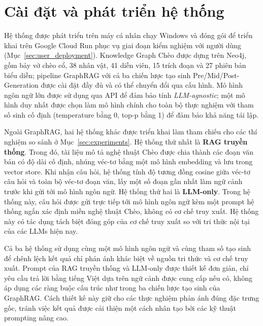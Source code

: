 
\section{Cài đặt và phát triển hệ thống}
\label{sec:system_setup}

Hệ thống được phát triển trên máy cá nhân chạy Windows và đóng gói để triển khai trên Google Cloud Run phục vụ giai đoạn kiểm nghiệm với người dùng (Mục~\ref{sec:user_deployment}). Knowledge Graph Chèo được dựng trên Neo4j, gồm bảy vở chèo cổ, 38 nhân vật, 41 diễn viên, 15 trích đoạn và 27 phiên bản biểu diễn; pipeline GraphRAG với cả ba chiến lược tạo sinh Pre/Mid/Post-Generation được cài đặt đầy đủ và có thể chuyển đổi qua cấu hình. Mô hình ngôn ngữ lớn được sử dụng qua API để đảm bảo tính \textit{LLM-agnostic}; một mô hình duy nhất được chọn làm mô hình chính cho toàn bộ thực nghiệm với tham số sinh cố định (temperature bằng 0, top-p bằng 1) để đảm bảo khả năng tái lập.

Ngoài GraphRAG, hai hệ thống khác được triển khai làm tham chiếu cho các thí nghiệm so sánh ở Mục~\ref{sec:experiments}. Hệ thống thứ nhất là \textbf{RAG truyền thống}. Trong đó, tài liệu mô tả nghệ thuật Chèo được chia thành các đoạn văn bản có độ dài cố định, nhúng véc-tơ bằng một mô hình embedding và lưu trong vector store. Khi nhận câu hỏi, hệ thống tính độ tương đồng cosine giữa véc-tơ câu hỏi và toàn bộ véc-tơ đoạn văn, lấy một số đoạn gần nhất làm ngữ cảnh trước khi gửi tới mô hình ngôn ngữ. Hệ thống thứ hai là \textbf{LLM-only}. Trong hệ thống này, câu hỏi được gửi trực tiếp tới mô hình ngôn ngữ kèm một prompt hệ thống ngắn xác định miền nghệ thuật Chèo, không có cơ chế truy xuất. Hệ thống này có tác dụng tách biệt đóng góp của cơ chế truy xuất so với tri thức nội tại của các LLMs hiện nay.

Cả ba hệ thống sử dụng cùng một mô hình ngôn ngữ và cùng tham số tạo sinh để chênh lệch kết quả chỉ phản ánh khác biệt về nguồn tri thức và cơ chế truy xuất. Prompt của RAG truyền thống và LLM-only được thiết kế đơn giản, chỉ yêu cầu trả lời bằng tiếng Việt dựa trên ngữ cảnh được cung cấp nếu có, không áp dụng các ràng buộc cấu trúc như trong ba chiến lược tạo sinh của GraphRAG. Cách thiết kế này giữ cho các thực nghiệm phản ánh đúng đặc trưng gốc, tránh việc kết quả được cải thiện một cách nhân tạo bởi các kỹ thuật prompting nâng cao.
